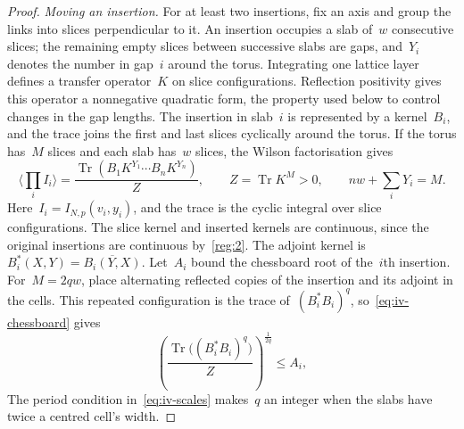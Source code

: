 \begin{proof}
\emph{Moving an insertion.}
For at least two insertions, fix an axis and group the links into slices perpendicular to it. An insertion occupies a slab of~$w$ consecutive slices; the remaining empty slices between successive slabs are gaps, and~$Y_i$ denotes the number in gap~$i$ around the torus. Integrating one lattice layer defines a transfer operator~$K$ on slice configurations. Reflection positivity gives this operator a nonnegative quadratic form, the property used below to control changes in the gap lengths. The insertion in slab~$i$ is represented by a kernel~$B_i$, and the trace joins the first and last slices cyclically around the torus.
If the torus has~$M$ slices and each slab has~$w$ slices, the Wilson factorisation gives
\begin{equation*}
 \langle\prod_i I_i\rangle
 =\frac{\operatorname{Tr}(B_1K^{Y_1}\cdots B_nK^{Y_n})}{Z},
 \qquad Z=\operatorname{Tr}K^M>0,\qquad nw+\sum_iY_i=M.
\end{equation*}
Here~$I_i=I_{N,p}(v_i,y_i)$, and the trace is the cyclic integral over slice configurations.
The slice kernel and inserted kernels are continuous, since the original insertions are continuous by~\ref{reg:2}.
The adjoint kernel is~$B_i^*(X,Y)=\overline{B_i(Y,X)}$.
Let~$A_i$ bound the chessboard root of the~$i$th insertion.
For~$M=2qw$, place alternating reflected copies of the insertion and its adjoint in the cells. This repeated configuration is the trace of~$(B_i^*B_i)^q$, so~\eqref{eq:iv-chessboard} gives
\begin{equation*}
 \left(\frac{\operatorname{Tr}\bigl((B_i^*B_i)^q\bigr)}{Z}\right)^{\frac{1}{2q}}
 \le A_i,
\end{equation*}
The period condition in~\eqref{eq:iv-scales} makes~$q$ an integer when the slabs have twice a centred cell's width.


\end{proof}
